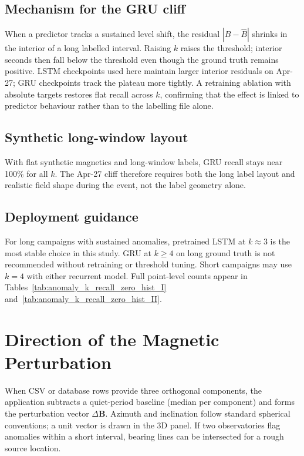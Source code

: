\subsection{Mechanism for the GRU cliff}
When a predictor tracks a sustained level shift, the residual $|B-\hat B|$ shrinks in the interior of a long labelled interval. Raising $k$ raises the threshold; interior seconds then fall below the threshold even though the ground truth remains positive. LSTM checkpoints used here maintain larger interior residuals on Apr-27; GRU checkpoints track the plateau more tightly. A retraining ablation with absolute targets restores flat recall across $k$, confirming that the effect is linked to predictor behaviour rather than to the labelling file alone.

\subsection{Synthetic long-window layout}
With flat synthetic magnetics and long-window labels, GRU recall stays near 100\% for all $k$. The Apr-27 cliff therefore requires both the long label layout and realistic field shape during the event, not the label geometry alone.

\subsection{Deployment guidance}
For long campaigns with sustained anomalies, pretrained LSTM at $k \approx 3$ is the most stable choice in this study. GRU at $k \ge 4$ on long ground truth is not recommended without retraining or threshold tuning. Short campaigns may use $k=4$ with either recurrent model. Full point-level counts appear in Tables~\ref{tab:anomaly_k_recall_zero_hist_I} and~\ref{tab:anomaly_k_recall_zero_hist_II}.



\section{Direction of the Magnetic Perturbation}
When CSV or database rows provide three orthogonal components, the application subtracts a quiet-period baseline (median per component) and forms the perturbation vector $\Delta\mathbf{B}$. Azimuth and inclination follow standard spherical conventions; a unit vector is drawn in the 3D panel. If two observatories flag anomalies within a short interval, bearing lines can be intersected for a rough source location.


